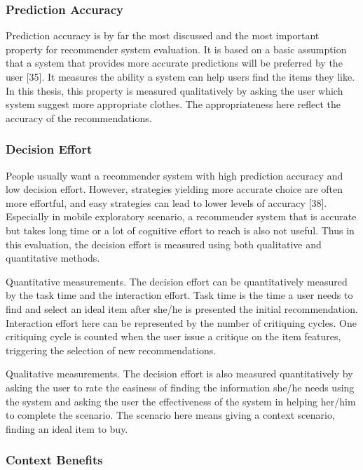 \subsubsection{Prediction Accuracy} \label{sec:ts_tf_pa}

Prediction accuracy is by far the most discussed and the most important property for recommender system evaluation. It is based on a basic assumption that a system that provides more accurate predictions will be preferred by the user [35]. It measures the ability a system can help users find the items they like. In this thesis, this property is measured qualitatively by asking the user which system suggest more appropriate clothes. The appropriateness here reflect the accuracy of the recommendations. 

\subsubsection{Decision Effort} \label{sec:ts_tf_de}

People usually want a recommender system with high prediction accuracy and low decision effort. However, strategies yielding more accurate choice are often more effortful, and easy strategies can lead to lower levels of accuracy [38]. Especially in mobile exploratory scenario, a recommender system that is accurate but takes long time or a lot of cognitive effort to reach is also not useful. Thus in this evaluation, the decision effort is measured using both qualitative and quantitative methods.

Quantitative measurements. The decision effort can be quantitatively measured by the task time and the interaction effort. Task time is the time a user needs to find and select an ideal item after she/he is presented the initial recommendation. Interaction effort here can be represented by the number of critiquing cycles. One critiquing cycle is counted when the user issue a critique on the item features, triggering the selection of new recommendations.

Qualitative measurements. The decision effort is also measured quantitatively by asking the user to rate the easiness of finding the information she/he needs using the system and asking the user the effectiveness of the system in helping her/him to complete the scenario. The scenario here means giving a context scenario, finding an ideal item to buy.

\subsubsection{Context Benefits} \label{sec:ts_tf_cb}

